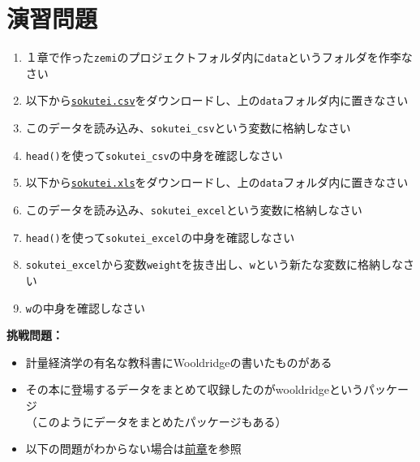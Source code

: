 \documentclass[
]{book}
\providecommand{\tightlist}{%
  \setlength{\itemsep}{0pt}\setlength{\parskip}{0pt}}
\begin{document}
\hypertarget{ux6f14ux7fd2ux554fux984c-3}{%
\section{演習問題}\label{ux6f14ux7fd2ux554fux984c-3}}

\begin{enumerate}
\def\labelenumi{\arabic{enumi}.}
\tightlist
\item
  １章で作った\texttt{zemi}のプロジェクトフォルダ内に\texttt{data}というフォルダを作李なさい\\
\item
  以下から\href{https://www.dropbox.com/s/8fy2dbnurinract/shitaisokutei.csv?dl=0}{\texttt{sokutei.csv}}をダウンロードし、上の\texttt{data}フォルダ内に置きなさい\\
\item
  このデータを読み込み、\texttt{sokutei\_csv}という変数に格納しなさい\\
\item
  \texttt{head()}を使って\texttt{sokutei\_csv}の中身を確認しなさい\\
\item
  以下から\href{https://www.dropbox.com/s/m4m4etyd81pnpq6/sokutei.xls?dl=0}{\texttt{sokutei.xls}}をダウンロードし、上の\texttt{data}フォルダ内に置きなさい\\
\item
  このデータを読み込み、\texttt{sokutei\_excel}という変数に格納しなさい\\
\item
  \texttt{head()}を使って\texttt{sokutei\_excel}の中身を確認しなさい\\
\item
  \texttt{sokutei\_excel}から変数\texttt{weight}を抜き出し、\texttt{w}という新たな変数に格納しなさい\\
\item
  \texttt{w}の中身を確認しなさい\\
\end{enumerate}

\textbf{挑戦問題：}

\begin{itemize}
\tightlist
\item
  計量経済学の有名な教科書にWooldridgeの書いたものがある\\
\item
  その本に登場するデータをまとめて収録したのがwooldridgeというパッケージ\\
  （このようにデータをまとめたパッケージもある）\\
\item
  以下の問題がわからない場合は\protect\hyperlink{ux30d1ux30c3ux30b1ux30fcux30b8}{前章}を参照
\end{itemize}
\end{document}
